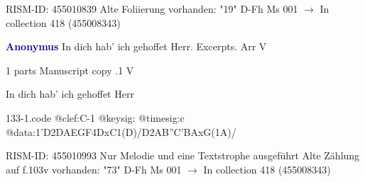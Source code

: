 \documentclass[twocolumn]{book}
\begin{document}
\newline RISM-ID: 455010839
\newline Alte Foliierung vorhanden: "19"
\newline D-Fh  Ms 001
\newline $\rightarrow$ In collection 418 (455008343)

\newline \par \vspace{7pt} \textcolor{darkblue}{\textbf{Anonymus  }}
\newline In dich hab' ich gehoffet Herr. Excerpts. Arr    
\newline V
\newline \begin{itshape}\end{itshape} 
\newline \textcolor{darkblue}{}  1 parts  
\newline Manuscript copy
.1  V
\newline \begin{footnotesize} In dich hab' ich gehoffet Herr \end{footnotesize}  
\begin{filecontents*}{133-1.code}
@clef:C-1
@keysig:
@timesig:c
@data:1'D2DAEGF4DxC1(D)/D2AB''C'BAxG(1A)/
\end{filecontents*}
\newline
%

\newline RISM-ID: 455010993
\newline Nur Melodie und eine Textstrophe ausgeführt
\newline Alte Zählung auf f.103v vorhanden: "73"
\newline D-Fh  Ms 001
\newline $\rightarrow$ In collection 418 (455008343)
\end{document}
